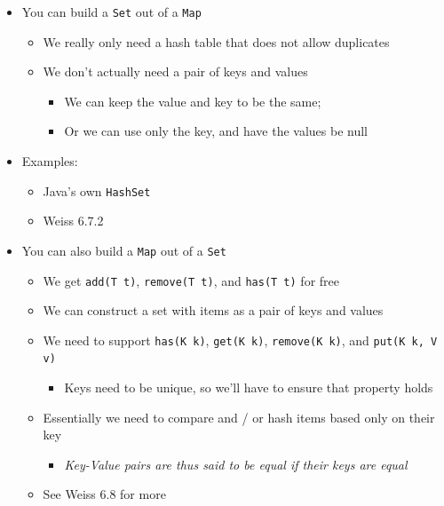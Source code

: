 \documentclass[
  10pt,
  english,
  letterpaper,
,tablecaptionabove
]{scrartcl}
\newcommand{\passthrough}[1]{#1}
\providecommand{\tightlist}{%
  \setlength{\itemsep}{0pt}\setlength{\parskip}{0pt}}
\begin{document}
\begin{itemize}
\tightlist
\item
  You can build a \passthrough{\lstinline!Set!} out of a
  \passthrough{\lstinline!Map!}

  \begin{itemize}
  \tightlist
  \item
    We really only need a hash table that does not allow duplicates
  \item
    We don't actually need a pair of keys and values

    \begin{itemize}
    \tightlist
    \item
      We can keep the value and key to be the same;
    \item
      Or we can use only the key, and have the values be null
    \end{itemize}
  \end{itemize}
\item
  Examples:

  \begin{itemize}
  \tightlist
  \item
    Java's own \passthrough{\lstinline!HashSet!}
  \item
    Weiss 6.7.2
  \end{itemize}
\item
  You can also build a \passthrough{\lstinline!Map!} out of a
  \passthrough{\lstinline!Set!}

  \begin{itemize}
  \tightlist
  \item
    We get \passthrough{\lstinline!add(T t)!},
    \passthrough{\lstinline!remove(T t)!}, and
    \passthrough{\lstinline!has(T t)!} for free
  \item
    We can construct a set with items as a pair of keys and values
  \item
    We need to support \passthrough{\lstinline!has(K k)!},
    \passthrough{\lstinline!get(K k)!},
    \passthrough{\lstinline!remove(K k)!}, and
    \passthrough{\lstinline!put(K k, V v)!}

    \begin{itemize}
    \tightlist
    \item
      Keys need to be unique, so we'll have to ensure that property
      holds
    \end{itemize}
  \item
    Essentially we need to compare and / or hash items based only on
    their key

    \begin{itemize}
    \tightlist
    \item
      \emph{Key-Value pairs are thus said to be equal if their keys are
      equal}
    \end{itemize}
  \item
    See Weiss 6.8 for more
  \end{itemize}
\end{itemize}
\end{document}
